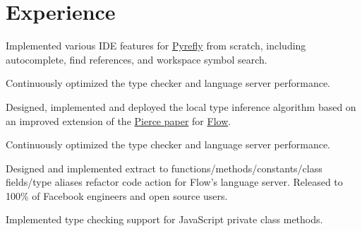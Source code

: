 \documentclass[]{res}
\begin{document}


\section{Experience}

\sectionsep

\begin{tightemize}
    \item Implemented various IDE features for \href{https://pyrefly.org}{Pyrefly} from scratch, including autocomplete, find references, and workspace symbol search.
    \item Continuously optimized the type checker and language server performance.
\end{tightemize}
\sectionsep

\begin{tightemize}
    \item Designed, implemented and deployed the local type inference algorithm based on an improved extension of the \href{https://www.cis.upenn.edu/~bcpierce/papers/lti-toplas.pdf}{Pierce paper} for \href{https://flow.org}{Flow}.
    \item Continuously optimized the type checker and language server performance.
\end{tightemize}
\sectionsep

\begin{tightemize}
    \item Designed and implemented extract to functions/methods/constants/class fields/type aliases refactor code action for Flow's language server. Released to 100\% of Facebook engineers and open source users.
    \item Implemented type checking support for JavaScript private class methods.
\end{tightemize}
\sectionsep
\end{document}
